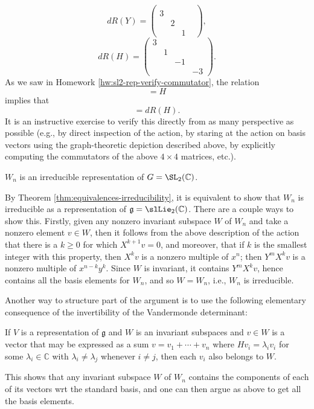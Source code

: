\documentclass[reqno]{amsart} 
\begin{document}
\begin{equation*}
  d R(Y)
  = 
\begin{pmatrix}
    &  & & \\
    3 &  &  & \\
    & 2 &  & \\
    & & 1 &
  \end{pmatrix}
,
\end{equation*}
\begin{equation*}
  d R(H)
  = 
\begin{pmatrix}
    3 &  & & \\
    &  1 &  & \\
    &  & -1  & \\
    & &  & -3
  \end{pmatrix}
.
\end{equation*}
As we saw in Homework \ref{hw:sl2-rep-verify-commutator},
the relation
\begin{equation*}
  [X,Y] = H
\end{equation*}
implies
that
\begin{equation*}
  [d R(X), d R(Y)] = d R(H).
\end{equation*}
It is an instructive exercise
to verify this directly
from as many perspective as possible
(e.g., by direct inspection of the action,
by staring at the action on basis vectors using the
graph-theoretic
depiction described above,
by explicitly computing the commutators of the above $4 \times
4$ matrices, etc.).

\begin{theorem}
  $W_n$ is an irreducible representation of $G = \SL_2(\mathbb{C})$.
\end{theorem}
By Theorem \ref{thm:equivalences-irreducibility},
it is equivalent to show that $W_n$ is irreducible
as a representation of $\mathfrak{g} = \slLie_2(\mathbb{C})$.
There are a couple ways to show this.
Firstly, given any nonzero invariant
subspace $W$ of $W_n$
and take a nonzero element $v \in W$,
then it follows from the above description
of the action that
there is a $k \geq 0$
for which $X^{k+1} v = 0$,
and moreover, that if $k$ is the smallest integer
with this property, then $X^k v$ is a nonzero
multiple of $x^n$;
then $Y^m X^k v$ is a nonzero
multiple of $x^{n-k} y^k$.
Since $W$ is invariant, it contains
$Y^m X^k v$,
hence contains all the basis elements for $W_n$,
and so $W = W_n$, i.e., $W_n$ is irreducible.

Another way to structure part of the argument is to use the
following
elementary consequence of the invertibility of the Vandermonde
determinant:
\begin{lemma}
 If $V$ is a representation of $\mathfrak{g}$
  and $W$ is an invariant subspaces
  and $v \in W$ is a vector that may be expressed
  as a sum $v = v_1 + \dotsb + v_n$
  where $H v_i = \lambda_i v_i$
  for some $\lambda_i \in \mathbb{C}$
  with $\lambda_i \neq \lambda_j$ whenever $i \neq j$,
  then
  each $v_i$ also belongs to $W$.
\end{lemma}
This shows that any invariant subspace
$W$ of $W_n$
contains the components
of each of its vectors wrt the standard basis,
and one can then argue as above to get all the basis elements.
\end{document}

